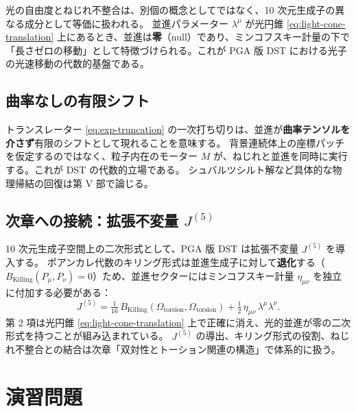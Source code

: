\documentclass[dvipdfmx,a4paper,oneside]{jsbook}
\numberwithin{equation}{chapter}
\begin{document}
光の自由度とねじれ不整合は、別個の概念としてではなく、10 次元生成子の異なる成分として等価に扱われる。
並進パラメーター \(\lambda^\mu\) が光円錐 \eqref{eq:light-cone-translation} 上にあるとき、並進は\textbf{零}（null）であり、ミンコフスキー計量の下で「長さゼロの移動」として特徴づけられる。これが PGA 版 DST における光子の光速移動の代数的基盤である。

\subsection{曲率なしの有限シフト}

トランスレーター \eqref{eq:exp-truncation} の一次打ち切りは、並進が\textbf{曲率テンソルを介さず}有限のシフトとして現れることを意味する。
背景連続体上の座標パッチを仮定するのではなく、粒子内在のモーター \(M\) が、ねじれと並進を同時に実行する。これが DST の代数的立場である。
シュバルツシルト解など具体的な物理帰結の回復は第 V 部で論じる。

\subsection{次章への接続：拡張不変量 \(J^{(5)}\)}

10 次元生成子空間上の二次形式として、PGA 版 DST は拡張不変量 \(J^{(5)}\) を導入する。
ポアンカレ代数のキリング形式は並進生成子に対して\textbf{退化}する（\(B_{\mathrm{Killing}}(P_\mu, P_\nu) = 0\)）ため、並進セクターにはミンコフスキー計量 \(\eta_{\mu\nu}\) を独立に付加する必要がある：
\begin{equation}
  J^{(5)}
  = \tfrac{1}{16}\, B_{\mathrm{Killing}}(\Omega_{\mathrm{torsion}}, \Omega_{\mathrm{torsion}})
  + \tfrac{1}{2}\, \eta_{\mu\nu}\, \lambda^\mu \lambda^\nu.
  \label{eq:J5-preview}
\end{equation}
第 2 項は光円錐 \eqref{eq:light-cone-translation} 上で正確に消え、光的並進が零の二次形式を持つことが組み込まれている。
\(J^{(5)}\) の導出、キリング形式の役割、ねじれ不整合との結合は次章「双対性とトーション関連の構造」で体系的に扱う。

\section*{演習問題}
\end{document}
